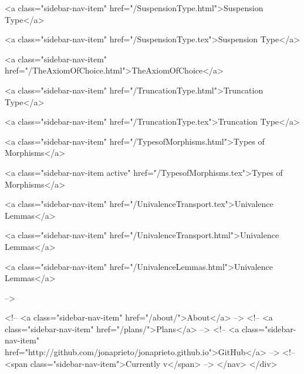       
    
      
        
          <a class="sidebar-nav-item" href="/SuspensionType.html">Suspension Type</a>
        
      
    
      
        
          <a class="sidebar-nav-item" href="/SuspensionType.tex">Suspension Type</a>
        
      
    
      
        
          <a class="sidebar-nav-item" href="/TheAxiomOfChoice.html">TheAxiomOfChoice</a>
        
      
    
      
        
          <a class="sidebar-nav-item" href="/TruncationType.html">Truncation Type</a>
        
      
    
      
        
          <a class="sidebar-nav-item" href="/TruncationType.tex">Truncation Type</a>
        
      
    
      
        
          <a class="sidebar-nav-item" href="/TypesofMorphisms.html">Types of Morphisms</a>
        
      
    
      
        
          <a class="sidebar-nav-item active" href="/TypesofMorphisms.tex">Types of Morphisms</a>
        
      
    
      
        
          <a class="sidebar-nav-item" href="/UnivalenceTransport.tex">Univalence Lemmas</a>
        
      
    
      
        
          <a class="sidebar-nav-item" href="/UnivalenceTransport.html">Univalence Lemmas</a>
        
      
    
      
        
          <a class="sidebar-nav-item" href="/UnivalenceLemmas.html">Univalence Lemmas</a>
        
      
     -->

    <!-- <a class="sidebar-nav-item" href="/about/">About</a> -->
    <!-- <a class="sidebar-nav-item" href="/plans/">Plans</a> -->
    <!-- <a class="sidebar-nav-item" href="http://github.com/jonaprieto/jonaprieto.github.io">GitHub</a> -->
    <!-- <span class="sidebar-nav-item">Currently v</span> -->
  </nav>
</div>

